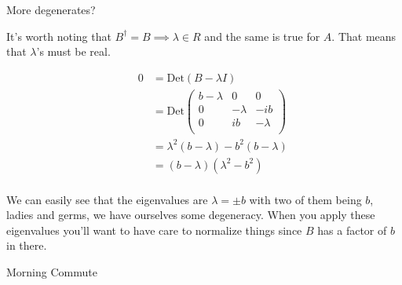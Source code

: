 \begin{answer}

  \begin{answerpart}{More degenerates?}

    It's worth noting that $B^{\dagger} = B \implies \lambda \in {R}$
    and the same is true for $A$.  That means that $\lambda$'s must be
    real.

    \begin{equation}
      \begin{alignedat}{2}
        &&0 &= \text{Det}(B - \lambda I)\\
        &&&=
        \text{Det}
        \begin{pmatrix}
          b - \lambda & 0 & 0\\
          0 & -\lambda & -ib\\
          0 & ib & -\lambda\\
        \end{pmatrix}
        \\
        &&&=
        \lambda^2(b-\lambda) - b^2(b-\lambda)
        \\
        &&&=
        (b - \lambda)
        (\lambda^2 - b^2)
        \\
      \end{alignedat}
    \end{equation}

    We can easily see that the eigenvalues are $\lambda = \pm b$ with
    two of them being $b$, ladies and germs, we have ourselves some
    degeneracy.  When you apply these eigenvalues you'll want to have
    care to normalize things since $B$ has a factor of $b$ in there.
  \end{answerpart}

  \begin{answerpart}{Morning Commute}


\end{answerpart}
\end{answer}
